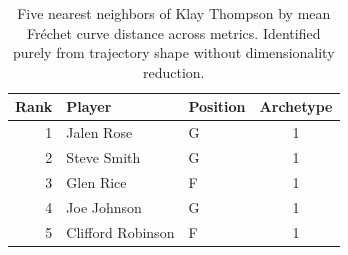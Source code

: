 \begin{table}[htbp]
  \centering\small
  \begin{tabular}{rllc}
    \toprule
    Rank & Player & Position & Archetype \\
    \midrule
    1 & Jalen Rose & G & 1 \\
    2 & Steve Smith & G & 1 \\
    3 & Glen Rice & F & 1 \\
    4 & Joe Johnson & G & 1 \\
    5 & Clifford Robinson & F & 1 \\
    \bottomrule
  \end{tabular}
  \caption{Five nearest neighbors of Klay Thompson by mean Fr\'{e}chet curve distance across metrics. Identified purely from trajectory shape without dimensionality reduction.}
  \label{tab:Klay_Thompson_frechet_curve_neighbors}
\end{table}

